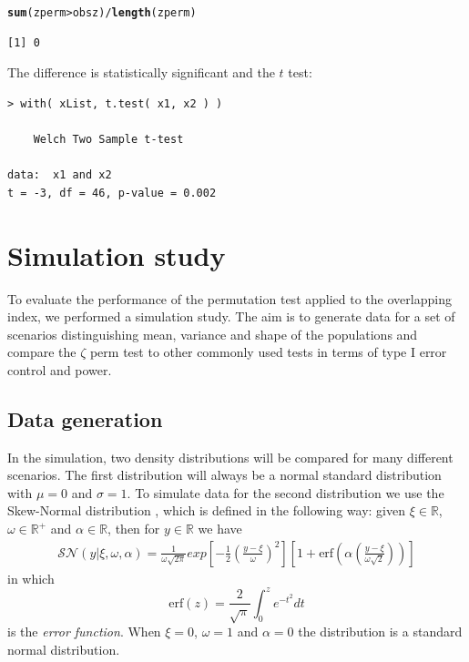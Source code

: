 \documentclass[10pt]{article}\usepackage[]{graphicx}\usepackage[]{xcolor}
\makeatletter
\newcommand{\hlopt}[1]{\textcolor[rgb]{0,0,0}{#1}}%
\newcommand{\hlstd}[1]{\textcolor[rgb]{0.345,0.345,0.345}{#1}}%
\newcommand{\hlkwd}[1]{\textcolor[rgb]{0.737,0.353,0.396}{\textbf{#1}}}%
\newenvironment{kframe}{%
 \def\at@end@of@kframe{}%
 \ifinner\ifhmode%
  \def\at@end@of@kframe{\end{minipage}}%
  \begin{minipage}{\columnwidth}%
 \fi\fi%
 \def\FrameCommand##1{\hskip\@totalleftmargin \hskip-\fboxsep
 \colorbox{shadecolor}{##1}\hskip-\fboxsep
     \hskip-\linewidth \hskip-\@totalleftmargin \hskip\columnwidth}%
 \MakeFramed {\advance\hsize-\width
   \@totalleftmargin\z@ \linewidth\hsize
   \@setminipage}}%
 {\par\unskip\endMakeFramed%
 \at@end@of@kframe}
\newenvironment{knitrout}{}{} %
\makeatother
\begin{document}
\begin{knitrout}
\color{fgcolor}\begin{kframe}
\begin{alltt}
\hlkwd{sum}\hlstd{( zperm} \hlopt{>} \hlstd{obsz )} \hlopt{/} \hlkwd{length}\hlstd{( zperm )}
\end{alltt}
\begin{verbatim}
[1] 0
\end{verbatim}
\end{kframe}
\end{knitrout}

The difference is statistically significant and the $t$ test:
\begin{knitrout}
\color{fgcolor}\begin{kframe}
\begin{verbatim}
> with( xList, t.test( x1, x2 ) ) 
 
	Welch Two Sample t-test 
 
data:  x1 and x2 
t = -3, df = 46, p-value = 0.002 
\end{verbatim}
\end{kframe}
\end{knitrout}


\section{Simulation study}

To evaluate the performance of the permutation test applied to the overlapping index, we performed a simulation study. The aim is to generate data for a set of scenarios distinguishing mean, variance and shape of the populations and compare the $\zeta$ perm test to other commonly used tests in terms of type I error control and power. 

\subsection{Data generation}

In the simulation, two density distributions will be compared for many different scenarios. The first distribution will always be a normal standard distribution with $\mu = 0$ and $\sigma = 1$. 
To simulate data for the second distribution we use the Skew-Normal distribution \cite{azzalini:1985}, which is defined in the following way: given $\xi \in \mathbb{R}$, $\omega \in \mathbb{R}^{+}$ and $\alpha \in \mathbb{R}$, then for $y \in \mathbb{R}$ we have  
\begin{eqnarray}
\mathcal{SN}(y|\xi, \omega, \alpha) = \frac{1}{\omega \sqrt{2\pi}} exp \left[ -\frac{1}{2} \left( \frac{y-\xi}{\omega} \right)^2  \right] \left[ 1+ \text{erf}\left( \alpha \left( \frac{y-\xi}{\omega\sqrt{2}}\right) \right) \right]
\end{eqnarray} 
in which $$\text{erf}(z) = \frac{2}{\sqrt{\pi}} \int_{0}^{z} e^{-t^2} dt $$ is the \emph{error function}.
When $\xi = 0$, $\omega = 1$ and $\alpha = 0$ the distribution is a standard normal distribution.
\end{document}
